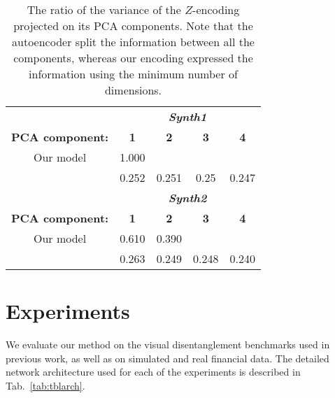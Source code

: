 \documentclass[10pt,twocolumn,letterpaper]{article}
\begin{document}
\begin{table}[]
\centering
\begin{tabular}{ccccc}
\toprule
       & \multicolumn{4}{c}{\textbf{\textit{Synth1}}}                       \\ \cmidrule{2-5} 
\textbf{PCA component:}             & \textbf{1} & \textbf{2} & \textbf{3} & \textbf{4} \\ \midrule
Our model             & 1.000      &            &            &            \\
~\cite{disentanglement}  & 0.252      & 0.251      & 0.25       & 0.247 \\ 
\cmidrule{2-5}       & \multicolumn{4}{c}{\textbf{\textit{Synth2}}}                       \\ 
\textbf{PCA component:}             & \textbf{1} & \textbf{2} & \textbf{3} & \textbf{4} \\ \midrule
Our model             & 0.610      & 0.390      &            &            \\
~\cite{disentanglement}  & 0.263      & 0.249      & 0.248      & 0.240      \\ 
\hline
\end{tabular}
\smallskip
\caption{The ratio of the variance of the $Z$-encoding projected on its PCA components. Note that the autoencoder split the information between all the components, whereas our encoding expressed the information using the minimum number of dimensions.}
\label{tbl_syntpca}
\end{table}

\section{Experiments}

We evaluate our method on the visual disentanglement benchmarks used in previous work, as well as on simulated and real financial data. The detailed network architecture used for each of the experiments is described in Tab.~\ref{tab:tblarch}.
\end{document}
